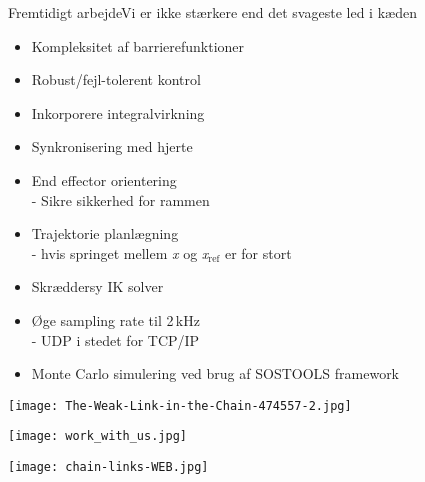 \begin{frame}{Fremtidigt arbejde}{Vi er ikke stærkere end det svageste led i kæden}
\begin{minipage}{0.65\textwidth}
\begin{block}{}
	\begin{itemize}
		\item \normalsize Kompleksitet af barrierefunktioner
		\item \normalsize Robust/fejl-tolerent kontrol %
		\item \normalsize Inkorporere integralvirkning \\ 
		\item \normalsize Synkronisering med hjerte
		\item \normalsize End effector orientering \\
		\scriptsize {\color{white}{m}} -  Sikre sikkerhed for rammen
		\item \normalsize  Trajektorie planlægning \\ 
		\scriptsize {\color{white}{m}} - hvis springet mellem \textit{x} og \textit{x}$_{\text{ref}}$ er for stort
		\item \normalsize Skræddersy IK solver
		\item Øge sampling rate til 2\,kHz \\
		\scriptsize {\color{white}{m}} - UDP i stedet for TCP/IP
		\item \normalsize  Monte Carlo simulering ved brug af SOSTOOLS framework
	\end{itemize}
\end{block}
\end{minipage}
\begin{minipage}{0.3\textwidth}
\texttt{[image: The-Weak-Link-in-the-Chain-474557-2.jpg]}
\vspace*{0.2cm}

\texttt{[image: work\_with\_us.jpg]}
\vspace*{0.2cm}

\texttt{[image: chain-links-WEB.jpg]}
\end{minipage}
\end{frame}